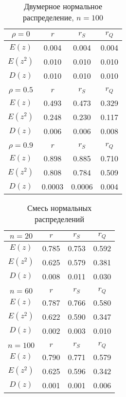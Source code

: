 \begin{table}[h]
	\centering
		\begin{tabular} {|c|c|c|c|}
			\hline
			$\rho=0$ & $r$ & $r_S$ & $r_Q$ \\ \hline
			$E(z)$ & 0.004 & 0.004 & 0.004 \\ \hline
			$E(z^2)$ & 0.010 & 0.010 & 0.010 \\ \hline
			$D(z)$ & 0.010 & 0.010 & 0.010 \\ \hline
			&&&\\ \hline
			$\rho=0.5$ & $r$ & $r_S$ & $r_Q$ \\ \hline
			$E(z)$ & 0.493 & 0.473 & 0.329 \\ \hline
			$E(z^2)$ & 0.248 & 0.230 & 0.117 \\ \hline
			$D(z)$ & 0.006 & 0.006 & 0.008 \\ \hline
			&&&\\ \hline
			$\rho=0.9$ & $r$ & $r_S$ & $r_Q$ \\ \hline
			$E(z)$ & 0.898 & 0.885 & 0.710 \\ \hline
			$E(z^2)$ & 0.808 & 0.784 & 0.509 \\ \hline
			$D(z)$ & 0.0003 & 0.0006 & 0.004 \\ \hline
		\end{tabular}
	\caption{Двумерное нормальное распределение, $n=100$}
\end{table}

\begin{table}[h]
	\centering
		\begin{tabular} {|c|c|c|c|}
			\hline
			$n=20$ & $r$ & $r_S$ & $r_Q$ \\ \hline
			$E(z)$ & 0.785 & 0.753 & 0.592 \\ \hline
			$E(z^2)$ & 0.625 & 0.579 & 0.381 \\ \hline
			$D(z)$ & 0.008 & 0.011 & 0.030 \\ \hline
			&&&\\ \hline
			$n=60$ & $r$ & $r_S$ & $r_Q$ \\ \hline
			$E(z)$ & 0.787 & 0.766 & 0.580 \\ \hline
			$E(z^2)$ & 0.622 & 0.590 & 0.347 \\ \hline
			$D(z)$ & 0.002 & 0.003 & 0.010 \\ \hline
			&&&\\ \hline
			$n=100$ & $r$ & $r_S$ & $r_Q$ \\ \hline
			$E(z)$ & 0.790 & 0.771 & 0.579 \\ \hline
			$E(z^2)$ & 0.625 & 0.596 & 0.342 \\ \hline
			$D(z)$ & 0.001 & 0.001 & 0.006 \\ \hline
		\end{tabular}
	\caption{Смесь нормальных распределений}
\end{table}

